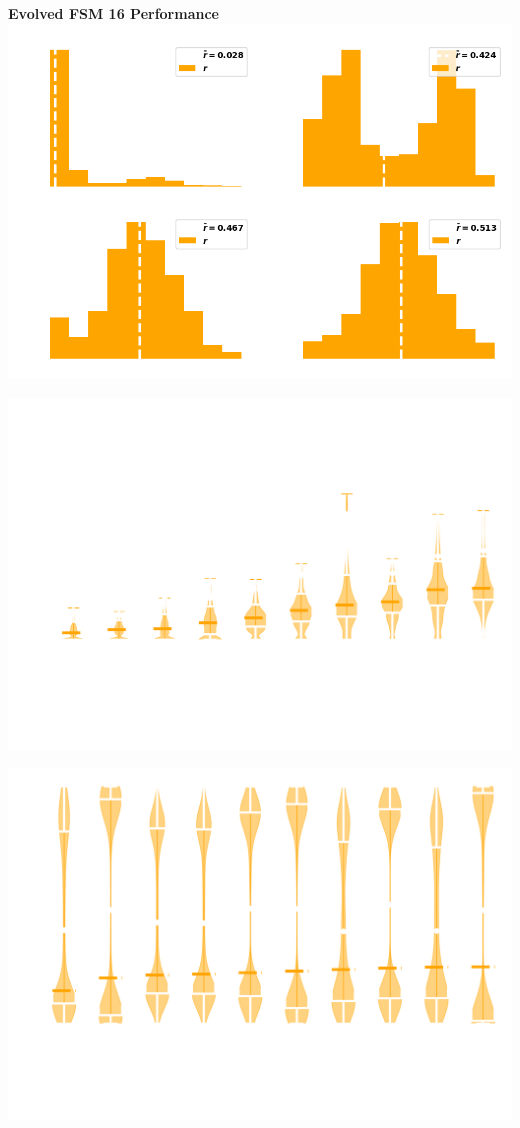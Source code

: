 \documentclass{beamer}
\begin{document}
\begin{frame}
    \begin{center}
        \textbf{Evolved FSM 16 Performance} \\ \vspace{1cm}
        \includegraphics[width=.8\textwidth]{static/evolved_FSM_16_distributions.png} 
    \end{center}
\end{frame}

\begin{frame}
    \begin{center}
        \includegraphics[width=.8\textwidth]{static/performances_standard.png}
    \end{center}
\end{frame}

\begin{frame}
    \begin{center}
        \includegraphics[width=.8\textwidth]{static/performances_noisy.png}
    \end{center}
\end{frame}
\end{document}
